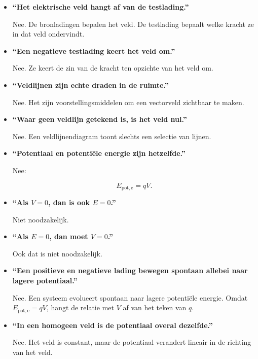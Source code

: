 \documentclass{ximera}
\begin{document}
\begin{itemize}

  \item \textbf{``Het elektrische veld hangt af van de testlading.''}

  Nee. De bronladingen bepalen het veld. De testlading bepaalt welke
  kracht ze in dat veld ondervindt.

  \item \textbf{``Een negatieve testlading keert het veld om.''}

  Nee. Ze keert de zin van de kracht ten opzichte van het veld om.

  \item \textbf{``Veldlijnen zijn echte draden in de ruimte.''}

  Nee. Het zijn voorstellingsmiddelen om een vectorveld zichtbaar te
  maken.

  \item \textbf{``Waar geen veldlijn getekend is, is het veld nul.''}

  Nee. Een veldlijnendiagram toont slechts een selectie van lijnen.

  \item \textbf{``Potentiaal en potentiële energie zijn hetzelfde.''}

  Nee:

  \[
  E_{\mathrm{pot,e}}=qV.
  \]

  \item \textbf{``Als $V=0$, dan is ook $E=0$.''}

  Niet noodzakelijk.

  \item \textbf{``Als $E=0$, dan moet $V=0$.''}

  Ook dat is niet noodzakelijk.

  \item \textbf{``Een positieve en negatieve lading bewegen spontaan
  allebei naar lagere potentiaal.''}

  Nee. Een systeem evolueert spontaan naar lagere potentiële energie.
  Omdat $E_{\mathrm{pot,e}}=qV$, hangt de relatie met $V$ af van het
  teken van $q$.

  \item \textbf{``In een homogeen veld is de potentiaal overal
  dezelfde.''}

  Nee. Het veld is constant, maar de potentiaal verandert lineair in de
  richting van het veld.

\end{itemize}
\end{document}
